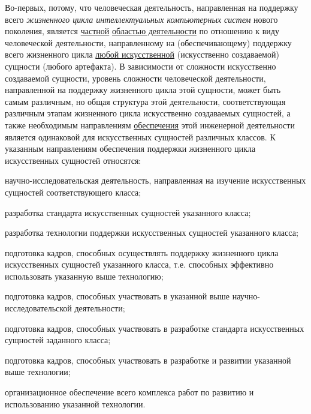 \begin{textitemize}
	\item
	Во-первых, потому, что человеческая деятельность, направленная на поддержку всего \textit{жизненного цикла интеллектуальных компьютерных систем} нового поколения, является \underline{частной} \underline{областью деятельности} по отношению к виду человеческой деятельности, направленному на (обеспечивающему) поддержку всего жизненного цикла \underline{любой искусственной} (искусственно создаваемой) сущности (любого артефакта). В зависимости от сложности искусственно создаваемой сущности, уровень сложности человеческой деятельности, направленной на поддержку жизненного цикла этой сущности, может быть самым различным, но общая структура этой деятельности, соответствующая различным этапам жизненного цикла искусственно создаваемых сущностей, а также необходимым направлениям \underline{обеспечения} этой инженерной деятельности является одинаковой для искусственных сущностей различных классов. К указанным направлениям обеспечения поддержки жизненного цикла искусственных сущностей относятся:
	\begin{textitemize}
		\item научно-исследовательская деятельность, направленная на изучение искусственных сущностей соответствующего класса;
		\item разработка стандарта искусственных сущностей указанного класса;
		\item разработка технологии поддержки искусственных сущностей указанного класса;
		\item подготовка кадров, способных осуществлять поддержку жизненного цикла искусственных сущностей указанного класса, т.е. способных эффективно использовать указанную выше технологию;
		\item подготовка кадров, способных участвовать в указанной выше научно-исследовательской деятельности;
		\item подготовка кадров, способных участвовать в разработке стандарта искусственных сущностей заданного класса;
		\item подготовка кадров, способных участвовать в разработке и развитии указанной выше технологии;
		\item организационное обеспечение всего комплекса работ по развитию и использованию указанной технологии.
	\end{textitemize}
	

\end{textitemize}
